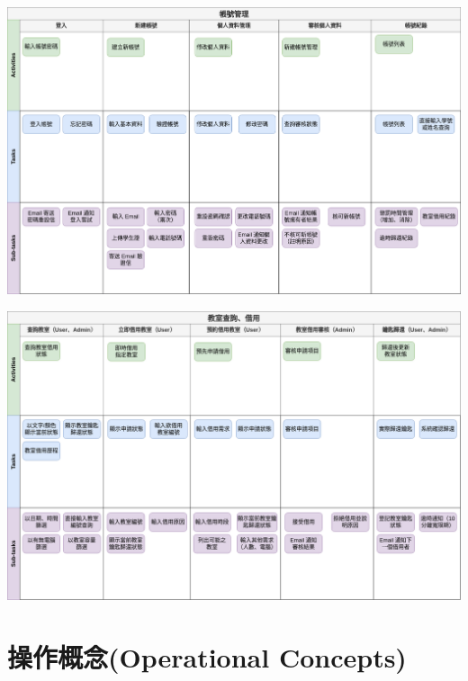 \documentclass{article}
\begin{document}
\begin{center}
	\includegraphics[height=0.45\textheight]{UserStoryMap-AccountManagement.png}
\end{center}

\begin{center}
	\includegraphics[height=0.45\textheight]{UserStoryMap-ClassroomBorrowing.png}
\end{center}

\newpage

\section[操作概念(OPERATIONAL CONCEPTS)]{操作概念(Operational Concepts)}

\newpage
\end{document}
